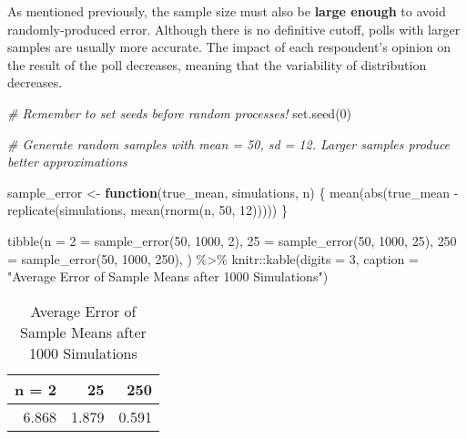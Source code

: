 \documentclass[
]{article}
\newenvironment{Shaded}{\begin{snugshade}}{\end{snugshade}}
\newcommand{\AttributeTok}[1]{\textcolor[rgb]{0.77,0.63,0.00}{#1}}
\newcommand{\CommentTok}[1]{\textcolor[rgb]{0.56,0.35,0.01}{\textit{#1}}}
\newcommand{\ControlFlowTok}[1]{\textcolor[rgb]{0.13,0.29,0.53}{\textbf{#1}}}
\newcommand{\DecValTok}[1]{\textcolor[rgb]{0.00,0.00,0.81}{#1}}
\newcommand{\FunctionTok}[1]{\textcolor[rgb]{0.00,0.00,0.00}{#1}}
\newcommand{\NormalTok}[1]{#1}
\newcommand{\OtherTok}[1]{\textcolor[rgb]{0.56,0.35,0.01}{#1}}
\newcommand{\SpecialCharTok}[1]{\textcolor[rgb]{0.00,0.00,0.00}{#1}}
\newcommand{\StringTok}[1]{\textcolor[rgb]{0.31,0.60,0.02}{#1}}
\begin{document}
As mentioned previously, the sample size must also be \textbf{large enough} to avoid randomly-produced error. Although there is no definitive cutoff, polls with larger samples are usually more accurate. The impact of each respondent's opinion on the result of the poll decreases, meaning that the variability of distribution decreases.

\begin{Shaded}
\begin{Highlighting}[]
\CommentTok{\# Remember to set seeds before random processes!}
\FunctionTok{set.seed}\NormalTok{(}\DecValTok{0}\NormalTok{)}

\CommentTok{\# Generate random samples with mean = 50, sd = 12. Larger samples produce better approximations}

\NormalTok{sample\_error }\OtherTok{\textless{}{-}} \ControlFlowTok{function}\NormalTok{(true\_mean, simulations, n) \{}
  \FunctionTok{mean}\NormalTok{(}\FunctionTok{abs}\NormalTok{(true\_mean }\SpecialCharTok{{-}} \FunctionTok{replicate}\NormalTok{(simulations, }\FunctionTok{mean}\NormalTok{(}\FunctionTok{rnorm}\NormalTok{(n, }\DecValTok{50}\NormalTok{, }\DecValTok{12}\NormalTok{)))))}
\NormalTok{\}}

\FunctionTok{tibble}\NormalTok{(}\StringTok{\textasciigrave{}}\AttributeTok{n = 2}\StringTok{\textasciigrave{}} \OtherTok{=} \FunctionTok{sample\_error}\NormalTok{(}\DecValTok{50}\NormalTok{, }\DecValTok{1000}\NormalTok{, }\DecValTok{2}\NormalTok{),}
       \StringTok{\textasciigrave{}}\AttributeTok{25}\StringTok{\textasciigrave{}} \OtherTok{=} \FunctionTok{sample\_error}\NormalTok{(}\DecValTok{50}\NormalTok{, }\DecValTok{1000}\NormalTok{, }\DecValTok{25}\NormalTok{),}
       \StringTok{\textasciigrave{}}\AttributeTok{250}\StringTok{\textasciigrave{}} \OtherTok{=} \FunctionTok{sample\_error}\NormalTok{(}\DecValTok{50}\NormalTok{, }\DecValTok{1000}\NormalTok{, }\DecValTok{250}\NormalTok{),}
\NormalTok{) }\SpecialCharTok{\%\textgreater{}\%}\NormalTok{ knitr}\SpecialCharTok{::}\FunctionTok{kable}\NormalTok{(}\AttributeTok{digits =} \DecValTok{3}\NormalTok{, }\AttributeTok{caption =} \StringTok{"Average Error of Sample Means after 1000 Simulations"}\NormalTok{)}
\end{Highlighting}
\end{Shaded}

\begin{table}

\caption{\label{tab:unnamed-chunk-4}Average Error of Sample Means after 1000 Simulations}
\centering
\begin{tabular}[t]{r|r|r}
\hline
n = 2 & 25 & 250\\
\hline
6.868 & 1.879 & 0.591\\
\hline
\end{tabular}
\end{table}
\end{document}
